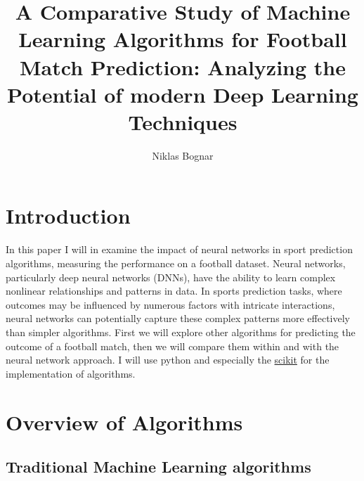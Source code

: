 
\usepackage[english]{babel}

\usepackage[a4paper,top=2cm,bottom=2cm,left=3cm,right=3cm,marginparwidth=1.75cm]{geometry}

\usepackage{amsmath}
\usepackage{graphicx}
\usepackage[colorlinks=true, allcolors=blue]{hyperref}

\title{A Comparative Study of Machine Learning Algorithms for Football Match Prediction: Analyzing the Potential of modern Deep Learning Techniques}
\author{Niklas Bognar}










\tableofcontents
\newpage


\maketitle
\section{Introduction}

In this paper I will in examine the impact of neural networks in sport prediction algorithms, measuring the performance on a football dataset.
Neural networks, particularly deep neural networks (DNNs), have the ability to learn complex nonlinear relationships and patterns in data. In sports prediction tasks, where outcomes may be influenced by numerous factors with intricate interactions, neural networks can potentially capture these complex patterns more effectively than simpler algorithms.
First we will explore other algorithms for predicting the outcome of a football match, then we will compare them within and with the neural network approach.
I will use python and especially the \href{https://scikit-learn.org/}{scikit} for the implementation of algorithms.


\section{Overview of Algorithms}
\subsection{Traditional Machine Learning algorithms}
